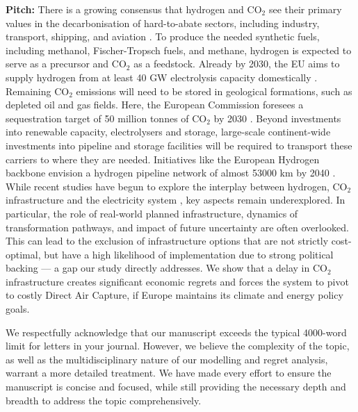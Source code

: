 \documentclass[10pt,a4paper,roman]{moderncv}        %
\begin{document}
\textbf{Pitch:} 
There is a growing consensus that hydrogen and CO$_2$ see their primary values in the decarbonisation of hard-to-abate sectors, including industry, transport, shipping, and aviation \cite{vangreevenbroekLittleLoseCase2025,reigstadMovingLowcarbonHydrogen2022,cerniauskasOptionsNaturalGas2020}. To produce the needed synthetic fuels, including methanol, Fischer-Tropsch fuels, and methane, hydrogen is expected to serve as a precursor and CO$_2$ as a feedstock. Already by 2030, the EU aims to supply hydrogen from at least 40 GW electrolysis capacity domestically \cite{europeancommissionCommunicationCommissionEuropean2020,europeancommissionREPowerEUPlanCommunication2022,europeanparliamentRegulationEU20242024}. Remaining CO$_2$ emissions will need to be stored in geological formations, such as depleted oil and gas fields. Here, the European Commission foresees a sequestration target of 50 million tonnes of CO$_2$ by 2030 \cite{europeancommissionREPowerEUPlanCommunication2022}. Beyond investments into renewable capacity, electrolysers and storage, large-scale continent-wide investments into pipeline and storage facilities will be required to transport these carriers to where they are needed. Initiatives like the European Hydrogen backbone envision a hydrogen pipeline network of almost 53000 km by 2040 \cite{europeanhydrogenbackboneinitiativeEuropeanHydrogenBackbone2022}. While recent studies have begun to explore the interplay between hydrogen, CO$_2$ infrastructure and the electricity system \cite{hofmannH2CO2Network2025,kountourisUnifiedEuropeanHydrogen2024,neumannPotentialRoleHydrogen2023,neumannGreenEnergySteel2025}, key aspects remain underexplored. In particular, the role of real-world planned infrastructure, dynamics of transformation pathways, and impact of future uncertainty are often overlooked. This can lead to the exclusion of infrastructure options that are not strictly cost-optimal, but have a high likelihood of implementation due to strong political backing \cite{trutnevyteDoesCostOptimization2016} --- a gap our study directly addresses. We show that a delay in CO$_2$ infrastructure creates significant economic regrets and forces the system to pivot to costly Direct Air Capture, if Europe maintains its climate and energy policy goals.

We respectfully acknowledge that our manuscript exceeds the typical 4000-word limit for letters in your journal. However, we believe the complexity of the topic, as well as the multidisciplinary nature of our modelling and regret analysis, warrant a more detailed treatment. We have made every effort to ensure the manuscript is concise and focused, while still providing the necessary depth and breadth to address the topic comprehensively.
\end{document}
